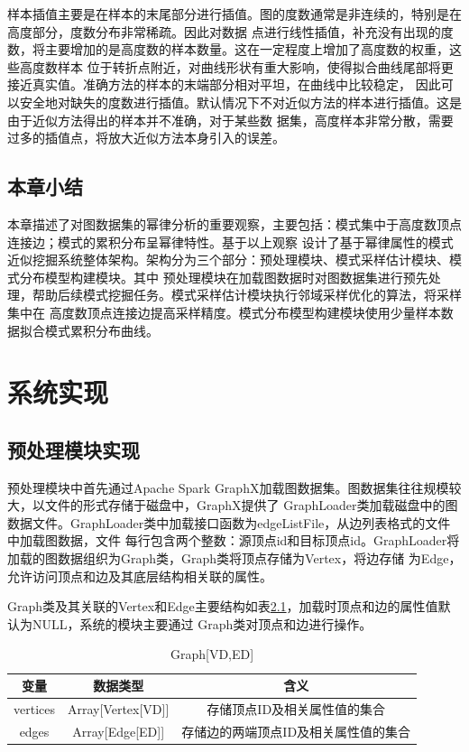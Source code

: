\documentclass[master]{thesis-uestc}
\begin{document}
    样本插值主要是在样本的末尾部分进行插值。图的度数通常是非连续的，特别是在高度部分，度数分布非常稀疏。因此对数据
点进行线性插值，补充没有出现的度数，将主要增加的是高度数的样本数量。这在一定程度上增加了高度数的权重，这些高度数样本
位于转折点附近，对曲线形状有重大影响，使得拟合曲线尾部将更接近真实值。准确方法的样本的末端部分相对平坦，在曲线中比较稳定，
因此可以安全地对缺失的度数进行插值。默认情况下不对近似方法的样本进行插值。这是由于近似方法得出的样本并不准确，对于某些数
据集，高度样本非常分散，需要过多的插值点，将放大近似方法本身引入的误差。

\section{本章小结}
    本章描述了对图数据集的幂律分析的重要观察，主要包括：模式集中于高度数顶点连接边；模式的累积分布呈幂律特性。基于以上观察
设计了基于幂律属性的模式近似挖掘系统整体架构。架构分为三个部分：预处理模块、模式采样估计模块、模式分布模型构建模块。其中
预处理模块在加载图数据时对图数据集进行预先处理，帮助后续模式挖掘任务。模式采样估计模块执行邻域采样优化的算法，将采样集中在
高度数顶点连接边提高采样精度。模式分布模型构建模块使用少量样本数据拟合模式累积分布曲线。

\chapter{系统实现}

\section{预处理模块实现}
\label{sec:preprocessing-impl}

    预处理模块中首先通过Apache Spark GraphX加载图数据集。图数据集往往规模较大，以文件的形式存储于磁盘中，GraphX提供了
GraphLoader类加载磁盘中的图数据文件。GraphLoader类中加载接口函数为edgeListFile，从边列表格式的文件中加载图数据，文件
每行包含两个整数：源顶点id和目标顶点id。GraphLoader将加载的图数据组织为Graph类，Graph类将顶点存储为Vertex，将边存储
为Edge，允许访问顶点和边及其底层结构相关联的属性。

    Graph类及其关联的Vertex和Edge主要结构如表\ref{tab:class-graph}，加载时顶点和边的属性值默认为NULL，系统的模块主要通过
Graph类对顶点和边进行操作。
\begin{table}
    \caption{Graph[VD,ED]}
    \begin{tabular}{|c|c|c|}
     \hline
     变量 & 数据类型 & 含义\\
     \hline
     vertices &  Array[Vertex[VD]] & 存储顶点ID及相关属性值的集合\\
     edges & Array[Edge[ED]] &存储边的两端顶点ID及相关属性值的集合\\
    \hline
    \end{tabular} 
    \label{tab:class-graph}
\end{table}
\end{document}
